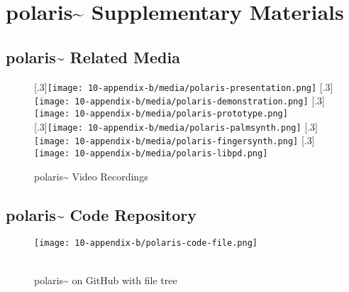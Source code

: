 \chapter{polaris\textasciitilde{} Supplementary Materials}

\section{polaris\textasciitilde{} Related Media}
\begin{figure}[!ht]
    \centering
    [.3\linewidth]{\texttt{[image: 10-appendix-b/media/polaris-presentation.png]}}
    \hfill
    [.3\linewidth]{\texttt{[image: 10-appendix-b/media/polaris-demonstration.png]}}
    \hfill
    [.3\linewidth]{\texttt{[image: 10-appendix-b/media/polaris-prototype.png]}} \\
    \vspace*{1cm}
    [.3\linewidth]{\texttt{[image: 10-appendix-b/media/polaris-palmsynth.png]}}
    \hfill
    [.3\linewidth]{\texttt{[image: 10-appendix-b/media/polaris-fingersynth.png]}}
    \hfill
    [.3\linewidth]{\texttt{[image: 10-appendix-b/media/polaris-libpd.png]}}%
    \caption*{polaris\textasciitilde{} Video Recordings}\label{sec: appendix-b-media}
\end{figure}
\clearpage



\section{polaris\textasciitilde{} Code Repository}
\begin{figure}[!ht]
    \centering
    \texttt{[image: 10-appendix-b/polaris-code-file.png]}
    \caption*{ \\ polaris\textasciitilde{} on GitHub with file tree}\label{sec: appendix-b-code}
\end{figure}
\clearpage



